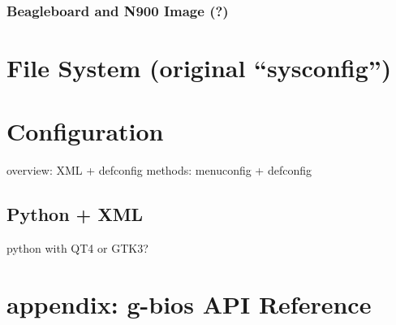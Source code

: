 \documentclass[a4paper,11pt]{book}
\begin{document}
\subsection{Beagleboard and N900 Image (?)}

\chapter{File System (original ``sysconfig'')}

\chapter{Configuration}
overview: XML + defconfig
methods: menuconfig + defconfig

\section{Python + XML}
python with QT4 or GTK3?

\chapter{appendix: g-bios API Reference}

\end{document}
